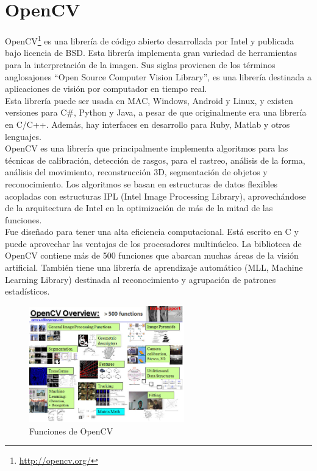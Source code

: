 \section{OpenCV}
OpenCV\footnote{\url{http://opencv.org/}} es una librería de código abierto desarrollada por Intel y publicada bajo licencia de BSD. Esta librería implementa gran variedad de herramientas para la interpretación de la imagen. Sus siglas provienen de los términos anglosajones ``Open Source Computer Vision Library'', es una librería destinada a aplicaciones de visión por computador en tiempo real.  \\

Esta librería puede ser usada en MAC, Windows, Android y Linux, y existen versiones para C\#, Python y Java, a pesar de que originalmente era una librería en C/C++. Además, hay interfaces en desarrollo para Ruby, Matlab y otros lenguajes.\\

OpenCV es una librería que principalmente implementa algoritmos para las técnicas de calibración, detección de rasgos, para el rastreo, análisis de la forma, análisis del movimiento, reconstrucción 3D, segmentación de objetos y reconocimiento. Los algoritmos se basan en estructuras de datos flexibles acopladas con estructuras IPL (Intel Image Processing Library), aprovechándose de la arquitectura de Intel en la optimización de más de la mitad de las funciones.  \\

Fue diseñado para tener una alta eficiencia computacional. Está escrito en C y puede aprovechar las ventajas de los procesadores multinúcleo. La biblioteca de OpenCV contiene más de 500 funciones que abarcan muchas áreas de la visión artificial. También tiene una librería de aprendizaje automático (MLL, Machine Learning Library) destinada al reconocimiento y agrupación de patrones estadísticos. 

\begin{figure}[H]
  \begin{center}
    \includegraphics[width=0.6\textwidth]{figures/Infraestructura/opencv.png}
		\caption{Funciones de OpenCV }
		\label{fig.opencv}
		\end{center}
\end{figure}

